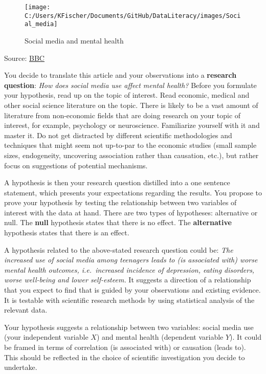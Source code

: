 \documentclass[
]{book}
\begin{document}
\begin{figure}

{\centering \texttt{[image: C:/Users/KFischer/Documents/GitHub/DataLiteracy/images/Social\_media]} 

}

\caption{Social media and mental health}\label{fig:social_media}
\end{figure}

Source: \href{https://www.bbc.com/news/technology-55826238}{BBC}

You decide to translate this article and your observations into a
\textbf{research question}: \emph{How does social media use affect
mental health?} Before you formulate your hypothesis, read up on the
topic of interest. Read economic, medical and other social science
literature on the topic. There is likely to be a vast amount of
literature from non-economic fields that are doing research on your
topic of interest, for example, psychology or neuroscience. Familiarize
yourself with it and master it. Do not get distracted by different
scientific methodologies and techniques that might seem not up-to-par to
the economic studies (small sample sizes, endogeneity, uncovering
association rather than causation, etc.), but rather focus on
suggestions of potential mechanisms.

A hypothesis is then your research question distilled into a one
sentence statement, which presents your expectations regarding the
results. You propose to prove your hypothesis by testing the
relationship between two variables of interest with the data at hand.
There are two types of hypotheses: alternative or null. The
\textbf{null} hypothesis states that there is no effect. The
\textbf{alternative} hypothesis states that there is an effect.

A hypothesis related to the above-stated research question could be:
\emph{The increased use of social media among teenagers leads to (is
associated with) worse mental health outcomes, i.e.~increased incidence
of depression, eating disorders, worse well-being and lower
self-esteem.} It suggests a direction of a relationship that you expect
to find that is guided by your observations and existing evidence. It is
testable with scientific research methods by using statistical analysis
of the relevant data.

Your hypothesis suggests a relationship between two variables: social
media use (your independent variable \(X\)) and mental health (dependent
variable \(Y\)). It could be framed in terms of correlation (is
associated with) or causation (leads to). This should be reflected in
the choice of scientific investigation you decide to undertake.
\end{document}

